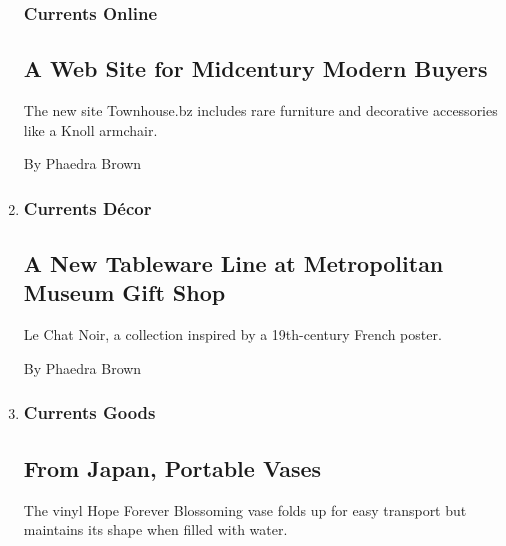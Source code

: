 \begin{enumerate}
  \hypertarget{currents--online}{%
  \subsubsection{Currents \textbar{} Online}\label{currents--online}}

  \hypertarget{a-web-site-for-midcentury-modern-buyers}{%
  \subsection{A Web Site for Midcentury Modern
  Buyers}\label{a-web-site-for-midcentury-modern-buyers}}

  The new site Townhouse.bz includes rare furniture and decorative
  accessories like a Knoll armchair.

  By Phaedra Brown
\item
  \href{/2010/09/02/garden/02decor.html}{}

  \hypertarget{currents--duxe9cor}{%
  \subsubsection{Currents \textbar{} Décor}\label{currents--duxe9cor}}

  \hypertarget{a-new-tableware-line-at-metropolitan-museum-gift-shop}{%
  \subsection{A New Tableware Line at Metropolitan Museum Gift
  Shop}\label{a-new-tableware-line-at-metropolitan-museum-gift-shop}}

  Le Chat Noir, a collection inspired by a 19th-century French poster.

  By Phaedra Brown
\item
  \href{/2010/08/19/garden/19goods.html}{}

  \hypertarget{currents--goods}{%
  \subsubsection{Currents \textbar{} Goods}\label{currents--goods}}

  \hypertarget{from-japan-portable-vases}{%
  \subsection{From Japan, Portable
  Vases}\label{from-japan-portable-vases}}

  The vinyl Hope Forever Blossoming vase folds up for easy transport but
  maintains its shape when filled with water.


\end{enumerate}
